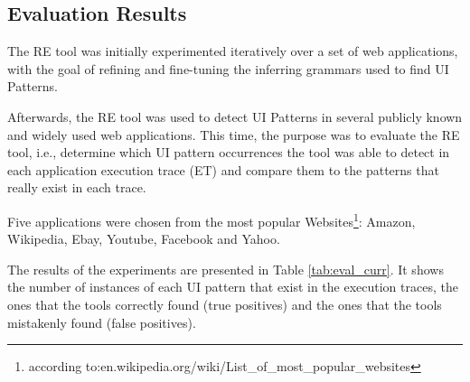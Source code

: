 \documentclass[10pt, conference, compsocconf]{IEEEtran}
\begin{document}
\subsection{Evaluation Results}

The RE tool was initially experimented iteratively over a set of web applications, with the goal of refining and fine-tuning the inferring grammars used to find UI Patterns.

Afterwards, the RE tool was used to detect UI Patterns in several publicly known and widely used web applications. This time, the purpose was to evaluate the RE tool, i.e., determine which UI pattern occurrences the tool was able to detect in each application execution trace (ET) and compare them to the patterns that really exist in each trace.

Five applications were chosen from the most popular Websites\footnote{according to:en.wikipedia.org/wiki/List\_of\_most\_popular\_websites‎}: Amazon, Wikipedia, Ebay, Youtube, Facebook and Yahoo.

The results of the experiments are presented in Table \ref{tab:eval_curr}. It shows the number of instances of each UI pattern that exist in the execution traces, the ones that the tools correctly found (true positives) and the ones that the tools mistakenly found (false positives). 

\begin{table}[!htb]
\caption{Evaluation set results from the current tool.}
\label{tab:eval_curr}
\end{table}
\end{document}
